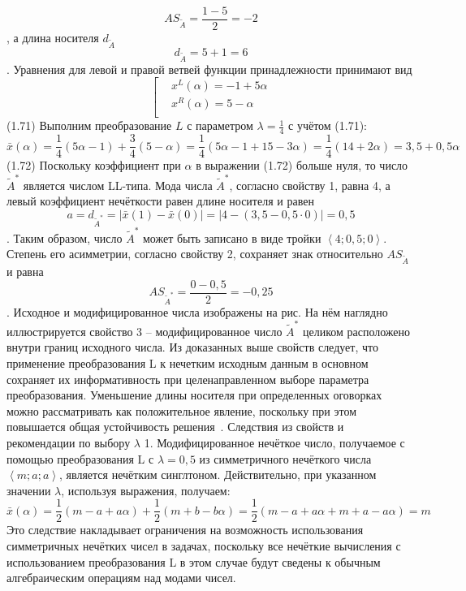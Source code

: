 	\[A{{S}_{{\tilde{A}}}}=\frac{1-5}{2}=-2\],
а длина носителя ${{d}_{{\tilde{A}}}}$
	\[{{d}_{{\tilde{A}}}}=5+1=6\].
Уравнения для левой и правой ветвей функции принадлежности принимают вид
	\[\left[ \begin{aligned}
  & {{x}^{L}}\left( \alpha  \right)=-1+5\alpha  \\ 
 & {{x}^{R}}\left( \alpha  \right)=5-\alpha  \\ 
\end{aligned} \right.\] 	(1.71)
Выполним преобразование $L$ с параметром $\lambda =\frac{1}{4}$ с учётом (1.71):
	\[\bar{x}\left( \alpha  \right)=\frac{1}{4}\left( 5\alpha -1 \right)+\frac{3}{4}\left( 5-\alpha  \right)=\frac{1}{4}\left( 5\alpha -1+15-3\alpha  \right)=\frac{1}{4}\left( 14+2\alpha  \right)=3,5+0,5\alpha \] 	(1.72)
Поскольку коэффициент при $\alpha $ в выражении (1.72) больше нуля, то число ${{\tilde{A}}^{*}}$ является числом LL-типа. Мода числа ${{\tilde{A}}^{*}}$, согласно свойству 1, равна 4, а левый коэффициент нечёткости равен длине носителя и равен
	\[a={{d}_{{{{\tilde{A}}}^{*}}}}=\left| \bar{x}\left( 1 \right)-\bar{x}\left( 0 \right) \right|=\left| 4-\left( 3,5-0,5\cdot 0 \right) \right|=0,5\].
Таким образом, число ${{\tilde{A}}^{*}}$ может быть записано в виде тройки $\left\langle 4;0,5;0 \right\rangle $. Степень его асимметрии, согласно свойству 2, сохраняет знак относительно $A{{S}_{{\tilde{A}}}}$ и равна
	\[A{{S}_{{{{\tilde{A}}}^{*}}}}=\frac{0-0,5}{2}=-0,25\].
Исходное и модифицированное числа изображены на рис. На нём наглядно иллюстрируется свойство 3 – модифицированное число ${{\tilde{A}}^{*}}$ целиком расположено внутри границ исходного числа.
Из доказанных выше свойств следует, что применение преобразования L к нечетким исходным данным в основном сохраняет их информативность при целенаправленном выборе параметра преобразования. Уменьшение длины носителя при определенных оговорках можно рассматривать как положительное явление, поскольку при этом повышается общая устойчивость решения~\cite{Vorontsov_PI}.
Следствия из свойств и рекомендации по выбору $\lambda $ 
1. Модифицированное нечёткое число, получаемое с помощью преобразования L с $\lambda =0,5$ из симметричного нечёткого числа $\left\langle m;a;a \right\rangle $, является нечётким синглтоном.
Действительно, при указанном значении $\lambda $, используя выражения, получаем:
	\[\bar{x}\left( \alpha  \right)=\frac{1}{2}\left( m-a+a\alpha  \right)+\frac{1}{2}\left( m+b-b\alpha  \right)=\frac{1}{2}\left( m-a+a\alpha +m+a-a\alpha  \right)=m\] 
Это следствие накладывает ограничения на возможность использования симметричных нечётких чисел в задачах, поскольку все нечёткие вычисления с использованием преобразования L в этом случае будут сведены к обычным алгебраическим операциям над модами чисел.
